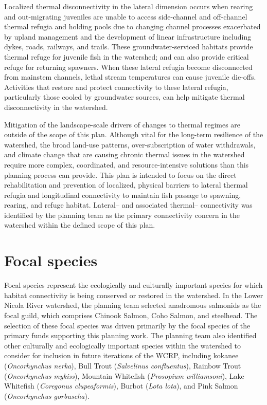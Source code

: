 \documentclass[
  letterpaper,
  DIV=11,
  numbers=noendperiod]{scrreprt}
\begin{document}
Localized thermal disconnectivity in the lateral dimension occurs when
rearing and out-migrating juveniles are unable to access side-channel
and off-channel thermal refugia and holding pools due to changing
channel processes exacerbated by upland management and the development
of linear infrastructure including dykes, roads, railways, and trails.
These groundwater-serviced habitats provide thermal refuge for juvenile
fish in the watershed; and can also provide critical refuge for
returning spawners. When these lateral refugia become disconnected from
mainstem channels, lethal stream temperatures can cause juvenile
die-offs. Activities that restore and protect connectivity to these
lateral refugia, particularly those cooled by groundwater sources, can
help mitigate thermal disconnectivity in the watershed.

Mitigation of the landscape-scale drivers of changes to thermal regimes
are outside of the scope of this plan. Although vital for the long-term
resilience of the watershed, the broad land-use patterns,
over-subscription of water withdrawals, and climate change that are
causing chronic thermal issues in the watershed require more complex,
coordinated, and resource-intensive solutions than this planning process
can provide. This plan is intended to focus on the direct rehabilitation
and prevention of localized, physical barriers to lateral thermal
refugia and longitudinal connectivity to maintain fish passage to
spawning, rearing, and refuge habitat. Lateral-- and associated
thermal-- connectivity was identified by the planning team as the
primary connectivity concern in the watershed within the defined scope
of this plan.

\hypertarget{focal-species}{%
\section*{Focal species}\label{focal-species}}


Focal species represent the ecologically and culturally important
species for which habitat connectivity is being conserved or restored in
the watershed. In the Lower Nicola River watershed, the planning team
selected anadromous salmonids as the focal guild, which comprises
Chinook Salmon, Coho Salmon, and steelhead. The selection of these focal
species was driven primarily by the focal species of the primary funds
supporting this planning work. The planning team also identified other
culturally and ecologically important species within the watershed to
consider for inclusion in future iterations of the WCRP, including
kokanee (\emph{Oncorhynchus nerka}), Bull Trout (\emph{Salvelinus
confluentus}), Rainbow Trout (\emph{Oncorhynchus mykiss}), Mountain
Whitefish (\emph{Prosopium williamsoni}), Lake Whitefish
(\emph{Coregonus clupeaformis}), Burbot (\emph{Lota lota}), and Pink
Salmon (\emph{Oncorhynchus gorbuscha}).
\end{document}
